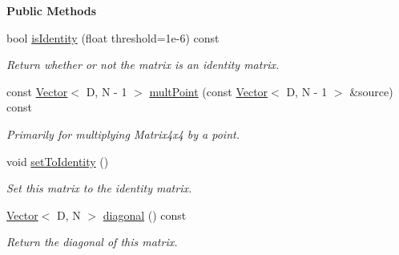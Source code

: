 \begin{Indent}\textbf{ Public Methods}\par
{\em 
\begin{DoxyItemize}
\item 
\end{DoxyItemize}}\begin{DoxyCompactItemize}
\item 
\mbox{\label{classrev_1_1_square_matrix_afb922bc5bb4b1452e1c78c447f85f01e}} 
bool \mbox{\hyperlink{classrev_1_1_square_matrix_afb922bc5bb4b1452e1c78c447f85f01e}{is\+Identity}} (float threshold=1e-\/6) const
\begin{DoxyCompactList}\small\item\em Return whether or not the matrix is an identity matrix. \end{DoxyCompactList}\item 
\mbox{\label{classrev_1_1_square_matrix_a229eaca4f5d8eee750e4fea1937acd77}} 
const \mbox{\hyperlink{classrev_1_1_vector}{Vector}}$<$ D, N -\/ 1 $>$ \mbox{\hyperlink{classrev_1_1_square_matrix_a229eaca4f5d8eee750e4fea1937acd77}{mult\+Point}} (const \mbox{\hyperlink{classrev_1_1_vector}{Vector}}$<$ D, N -\/ 1 $>$ \&source) const
\begin{DoxyCompactList}\small\item\em Primarily for multiplying Matrix4x4 by a point. \end{DoxyCompactList}\item 
\mbox{\label{classrev_1_1_square_matrix_ac597565c15e363f2619d396ddbaa34f1}} 
void \mbox{\hyperlink{classrev_1_1_square_matrix_ac597565c15e363f2619d396ddbaa34f1}{set\+To\+Identity}} ()
\begin{DoxyCompactList}\small\item\em Set this matrix to the identity matrix. \end{DoxyCompactList}\item 
\mbox{\label{classrev_1_1_square_matrix_a3dc5de90f5a47df46de9fc7244934dc6}} 
\mbox{\hyperlink{classrev_1_1_vector}{Vector}}$<$ D, N $>$ \mbox{\hyperlink{classrev_1_1_square_matrix_a3dc5de90f5a47df46de9fc7244934dc6}{diagonal}} () const
\begin{DoxyCompactList}\small\item\em Return the diagonal of this matrix. \end{DoxyCompactList}\item 

\end{DoxyCompactItemize}
\end{Indent}
